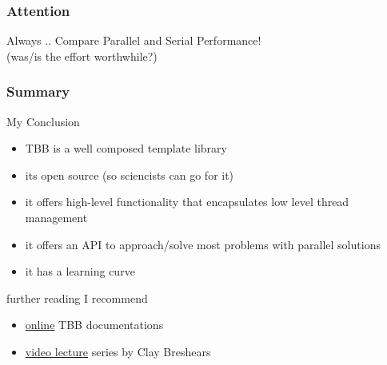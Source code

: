 \documentclass[9pt,pdftex]{beamer}
\begin{document}
\begin{frame}
  \frametitle{Attention}
  \vfill
  \begin{alertblock}{Always ..}
    Compare Parallel and Serial Performance!\\
    (was/is the effort worthwhile?)
  \end{alertblock}
  \vfill
\end{frame}

\begin{frame}
  \frametitle{Summary}
  \vfill
  \begin{block}{My Conclusion}
    \begin{itemize}
    \item TBB is a well composed template library
    \item its open source (so sciencists can go for it)
    \item it offers high-level functionality that encapsulates low level thread management
    \item it offers an API to approach/solve most problems with parallel solutions
    \item it has a learning curve
    \end{itemize}
  \end{block}

  \vfill
  \begin{block}{further reading I recommend}
    \begin{itemize}
    \item \href{http://threadingbuildingblocks.org/documentation.php}{online} TBB documentations
    \item \href{http://www.dailymotion.com/playlist/x1pc0m_Intel_Academic_EMEA_intro-to-parallel-programming/1#video=xksoje}{video lecture} series by Clay Breshears
    \end{itemize}
  \end{block}
\end{frame}

\end{document}
